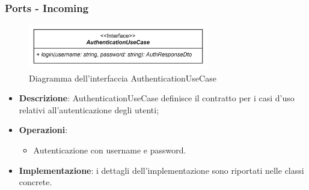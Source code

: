 \subsubsection{Ports - Incoming}

 \label{AuthenticationUseCase}
\begin{figure}[H]
    \centering
    \includegraphics[width=0.7\textwidth]{assets/Backend/authentication_use_case.png}
    \caption{Diagramma dell'interfaccia AuthenticationUseCase}
  \end{figure}
\begin{itemize}
    \item \textbf{Descrizione}: AuthenticationUseCase definisce il contratto per i casi d'uso relativi all'autenticazione degli utenti;
    \item \textbf{Operazioni}:
    \begin{itemize}
        \item Autenticazione con username e password.
    \end{itemize}
    \item \textbf{Implementazione}: i dettagli dell'implementazione sono riportati nelle classi concrete.
\end{itemize}  

